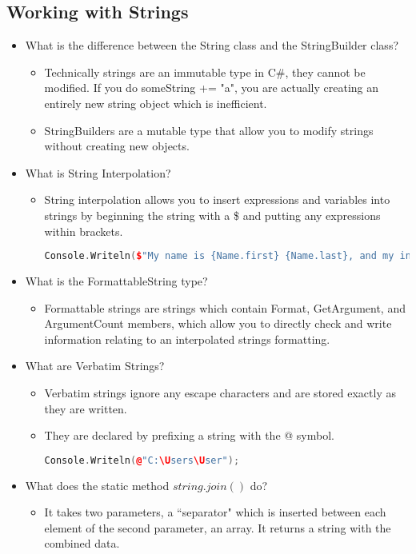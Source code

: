\documentclass{article}
\begin{document}
\subsection{Working with Strings}
\begin{itemize}
    \item What is the difference between the String class and the StringBuilder class?
    \begin{itemize}
        \item Technically strings are an immutable type in C\#, they cannot be modified. If you do someString += "a", you are actually creating an entirely new string object which is inefficient.
        \item StringBuilders are a mutable type that allow you to modify strings without creating new objects.
    \end{itemize}
    \item What is String Interpolation?
    \begin{itemize}
        \item String interpolation allows you to insert expressions and variables into strings by beginning the string with a \$ and putting any expressions within brackets.
        \begin{lstlisting}[language=C++]
                Console.Writeln($"My name is {Name.first} {Name.last}, and my initials are {Name.first[0] + Name.last[0]}"); \end{lstlisting} 
    \end{itemize}
    \item What is the FormattableString type?
    \begin{itemize}
        \item Formattable strings are strings which contain Format, GetArgument, and ArgumentCount members, which allow you to directly check and write information relating to an interpolated strings formatting.
    \end{itemize}
    \item What are Verbatim Strings?
    \begin{itemize}
        \item Verbatim strings ignore any escape characters and are stored exactly as they are written.
        \item They are declared by prefixing a string with the @ symbol.
        \begin{lstlisting}[language=C++]
                Console.Writeln(@"C:\Users\User"); \end{lstlisting} 
    \end{itemize}
    \item What does the static method $string.join()$ do?
    \begin{itemize}
        \item It takes two parameters, a ``separator" which is inserted between each element of the second parameter, an array. It returns a string with the combined data.
    \end{itemize}
\end{itemize}
\end{document}
